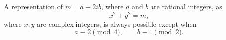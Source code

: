 \begin{proposition}
A representation of $m=a+2ib$, where $a$ and $b$ are rational integers, as
\[
    x^2+y^2=m,
\]
where $x,y$ are complex integers, is always possible except when
\[
    a\equiv2\pmod4,\qquad b\equiv1\pmod2.
\]
\end{proposition}
